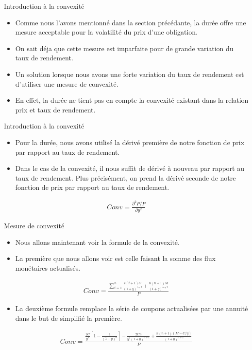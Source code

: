 \documentclass[11pt]{beamer}
\begin{document}
\begin{frame}{Introduction à la convexité}
\begin{itemize}
\item Comme nous l'avons mentionné dans la section précédante, la durée offre une mesure acceptable pour la volatilité du prix d'une obligation. 
\item On sait déja que cette mesure est imparfaite pour de grande variation du taux de rendement. 
\item Un solution lorsque nous avons une forte variation du taux de rendement est d'utiliser une mesure de convexité. 
\item En effet, la durée ne tient pas en compte la convexité existant dans la relation prix et taux de rendement. 
\end{itemize}
\end{frame}


\begin{frame}{Introduction à la convexité}
\begin{itemize}
\item Pour la durée,  nous avons utilisé la dérivé première de notre fonction de prix par rapport au taux de rendement. 
\item Dans le cas de la convexité, il nous suffit de dérivé à nouveau par rapport au taux de rendement. Plus précisément,  on prend la dérivé seconde de notre fonction de prix par rapport au taux de rendement.
\end{itemize}
\begin{align*}
Conv=\frac{\partial^2P /P}{\partial y^2}
\end{align*}
\end{frame}

\begin{frame}{Mesure de convexité}
\begin{itemize}
\item Nous allons maintenant voir la formule de la convexité. 
\item La première que nous allons voir est celle faisant la somme des flux monétaires actualisés. 
\end{itemize}
\begin{align*}
Conv=\frac{\sum_{t=1}^n \frac{t(t+1)C}{(1+y)^{t+2}}+\frac{n(n+1)M}{(1+y)^{n+2}}}{P}
\end{align*}
\begin{itemize}
\item La deuxième formule remplace la série de coupons actualisées par une annuité dans le but de simplifié la première.
\end{itemize}
\begin{align*}
Conv=\frac{\frac{2C}{y^3} \left[1-\frac{1}{(1+y)^n} \right] -\frac{2Cn}{y^2(1+y)^{n+1}}+\frac{n(n+1)(M-C/y)}{(1+y)^{n+2}}}{P}
\end{align*}
\end{frame}
\end{document}
